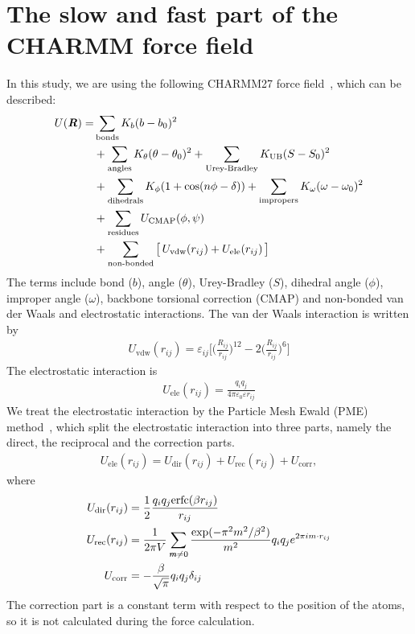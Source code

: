 \documentclass[aip,jcp,a4paper,reprint,onecolumn]{revtex4-1}
\newcommand{\vect}[1]{\textbf{\textit{#1}}}
\newcommand{\vdw}{\textrm{vdw}}
\newcommand{\ele}{\textrm{ele}}
\newcommand{\dir}{\textrm{dir}}
\newcommand{\rec}{\textrm{rec}}
\newcommand{\corr}{\textrm{corr}}
\newcommand{\eps}{\varepsilon}
\begin{document}
\section{The slow and fast part of the CHARMM force field}

In this study, we are using the following CHARMM27 force field~\cite{mackerell2004extending}, which can be described:
\begin{align}\nonumber
  U(\vect R) = &
  \sum_{\textrm{bonds}} K_b(b-b_0)^2\\\nonumber
  &
  +\sum_{\textrm{angles}} K_\theta (\theta - \theta_0)^2
  +\sum_{\textrm{Urey-Bradley}} K_{\textrm{UB}} (S - S_0)^2\\\nonumber
  &
  +\sum_{\textrm{dihedrals}} K_\phi( 1+\cos(n\phi - \delta)) 
  +\sum_{\textrm{impropers}} K_\omega (\omega - \omega_0)^2\\ \nonumber
  &
  +\sum_{\textrm{residues}} U_{\textrm{CMAP}}(\phi, \psi) \\\label{eqn:tmp13}
  &
  +\sum_{\textrm{non-bonded}}
  \big[\,U_{\vdw}(r_{ij}) + U_{\ele}(r_{ij})\,\big]
\end{align}
The terms include bond ($b$), angle ($\theta$), Urey-Bradley ($S$),
dihedral angle ($\phi$), improper angle ($\omega$), backbone torsional
correction (CMAP) and non-bonded van der Waals and electrostatic
interactions.  The van der Waals interaction is written by
\begin{align}
  U_{\vdw}(r_{ij}) = 
  \eps_{ij}
  \bigg[\bigg(\frac{R_{ij}}{r_{ij}}\bigg)^{12}
  - 2\bigg(\frac{R_{ij}}{r_{ij}}\bigg)^{6}
  \bigg]
\end{align}
The electrostatic interaction is
\begin{align}
  U_{\ele}(r_{ij}) = \frac{q_iq_j}{4\pi\eps_0\eps r_{ij}}
\end{align}
We treat the electrostatic interaction by the Particle Mesh Ewald (PME)
method~\cite{darden1993pme, essmann1995spm}, which split the electrostatic interaction into three parts,
namely the direct, the reciprocal and the correction parts.
\begin{align}
  U_{\ele}(r_{ij}) =
  U_{\dir}(r_{ij}) +
  U_{\rec}(r_{ij}) + U_{\corr},
\end{align}
where
\begin {align}
  U_{\dir} (r_{ij})& = \frac12 
  \frac{q_iq_j \textrm{erfc}(\beta {r}_{ij})}
  {{r}_{ij} } \\
  U_{\rec} (r_{ij})& = \frac1{2\pi V} \sum_{\vect m \neq 0}
  \frac{\exp(-\pi^2 m^2 / \beta^2)}{m^2}
   q_iq_j e^ {2 \pi i m \cdot r_{ij}}\\
  U_{\corr}& = -\frac\beta{\sqrt \pi} q_iq_j \delta_{ij}
\end {align}
The correction part is a constant term with respect to the position of
the atoms, so it is not calculated during
the force calculation.\\
\end{document}
